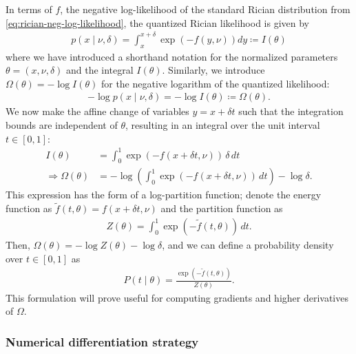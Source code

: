 \documentclass{article}
\begin{document}
In terms of $f$, the negative log-likelihood of the standard Rician distribution from \cref{eq:rician-neg-log-likelihood}, the quantized Rician likelihood is given by
%
\begin{align}
  p(x \mid \nu, \delta) = \int_x^{x + \delta} \exp(-f(y, \nu)) dy \coloneqq I(\theta)
\end{align}
%
where we have introduced a shorthand notation for the normalized parameters $\theta = (x, \nu, \delta)$ and the integral $I(\theta)$.
Similarly, we introduce $\Omega(\theta) = -\log I(\theta)$ for the negative logarithm of the quantized likelihood:
%
\begin{align}
  -\log p(x \mid \nu, \delta) = -\log I(\theta) \coloneqq \Omega(\theta).
\end{align}
%
We now make the affine change of variables $y = x + \delta t$ such that the integration bounds are independent of $\theta$, resulting in an integral over the unit interval $t \in [0, 1]$:
%
\begin{align}
  I(\theta)                  & = \int_0^1 \exp(-f(x + \delta t, \nu)) \, \delta \, dt                       \\
  \Rightarrow \Omega(\theta) & = -\log\left(\int_0^1 \exp(-f(x + \delta t, \nu)) \, dt\right) - \log\delta.
\end{align}
%
This expression has the form of a log-partition function;
denote the energy function as $\tilde{f}(t, \theta) = f(x + \delta t, \nu)$ and the partition function as
%
\begin{align}
  Z(\theta) = \int_0^1 \exp(-\tilde{f}(t, \theta)) \, dt.
\end{align}
%
Then, $\Omega(\theta) = -\log Z(\theta) - \log\delta$, and we can define a probability density over $t \in [0,1]$ as
%
\begin{align}
  P(t \mid \theta) = \frac{\exp(-\tilde{f}(t, \theta))}{Z(\theta)}.
\end{align}
%
This formulation will prove useful for computing gradients and higher derivatives of $\Omega$.

\subsubsection{Numerical differentiation strategy}
\end{document}
